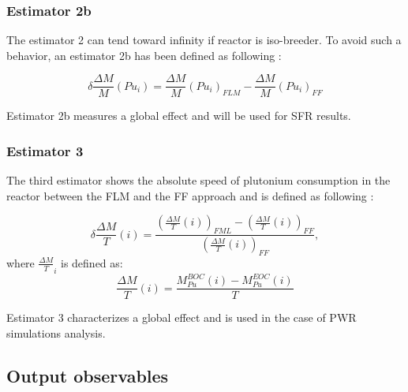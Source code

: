 \subsubsection{Estimator 2b}

The estimator 2 can tend toward infinity if reactor is iso-breeder. To avoid such a behavior, an estimator 2b has been defined as following : 

\begin{equation}
    \delta \frac{\Delta M}{M}(Pu_i) = \frac{\Delta M}{M}(Pu_i)_{FLM} - \frac{\Delta M}{M}(Pu_i)_{FF}
\end{equation}

Estimator 2b measures a global effect and will be used for \gls{SFR} results.

\subsubsection{Estimator 3}

The third estimator shows the absolute speed of plutonium consumption in the reactor between the \gls{FLM} and the \gls{FF} approach and is defined as following :

\begin{equation}
    \delta{\frac{\Delta M}{T}}(i) =
        \frac{\left(\frac{\Delta M}{T}(i)\right)_{FML}
              - \left(\frac{\Delta M}{T}(i)\right)_{FF}}
             {\left(\frac{\Delta M}{T}(i)\right)_{FF}},
\end{equation}
where $\frac{\Delta M}{T}_{i}$ is defined as:
\begin{equation}
    \frac{\Delta M}{T}(i) = \frac{M_{Pu}^{BOC}(i) -
    M_{Pu}^{EOC}(i)}{T}
\end{equation}

Estimator 3 characterizes a global effect and is used in the case of PWR simulations analysis.

\subsection{Output observables}


